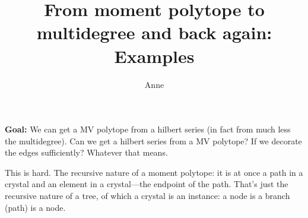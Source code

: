 \documentclass[11pt]{article}
\author{Anne}
\title{From moment polytope to multidegree and back again: Examples}
\date{\vspace{-10ex}}
\begin{document}
\maketitle
% 
{\bf Goal:}
    We can get a MV polytope from a hilbert series (in fact from much less the multidegree). Can we get a hilbert series from a MV polytope? If we decorate the edges sufficiently? Whatever that means.
% 

This is hard.
% 
    The recursive nature of a moment polytope: it is at once a path in a crystal and an element in a crystal---the endpoint of the path. That's just the recursive nature of a tree, of which a crystal is an instance: a node is a branch (path) is a node.
\end{document}
